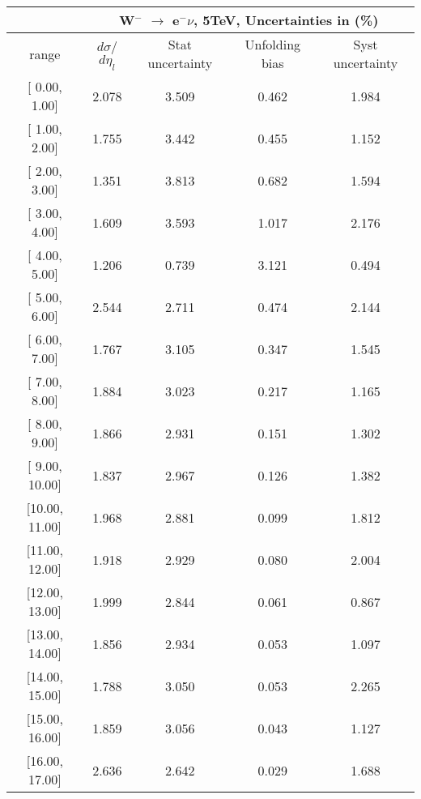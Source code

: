 \documentclass[12pt]{article}
\begin{document}
 
\begin{table}[] 
\begin{tabular}{c|c|c|c|c|}
\cline{2-5}
& \multicolumn{4}{c|}{W$^{-}$ $\rightarrow$ e$^{-} \nu $, 5TeV, Uncertainties in (\%)}  \\ \hline \hline 
\multicolumn{1}{|c|}{  range } & $d\sigma$/$d\eta_{l}$   & Stat uncertainty     & Unfolding bias     & Syst uncertainty        \\ \hline \hline 
\multicolumn{1}{|c|}{{[} 0.00,   1.00{]}}  & 2.078 & 3.509 & 0.462 & 1.984 \\ \hline 
\multicolumn{1}{|c|}{{[} 1.00,   2.00{]}}  & 1.755 & 3.442 & 0.455 & 1.152 \\ \hline 
\multicolumn{1}{|c|}{{[} 2.00,   3.00{]}}  & 1.351 & 3.813 & 0.682 & 1.594 \\ \hline 
\multicolumn{1}{|c|}{{[} 3.00,   4.00{]}}  & 1.609 & 3.593 & 1.017 & 2.176 \\ \hline 
\multicolumn{1}{|c|}{{[} 4.00,   5.00{]}}  & 1.206 & 0.739 & 3.121 & 0.494 \\ \hline 
\multicolumn{1}{|c|}{{[} 5.00,   6.00{]}}  & 2.544 & 2.711 & 0.474 & 2.144 \\ \hline 
\multicolumn{1}{|c|}{{[} 6.00,   7.00{]}}  & 1.767 & 3.105 & 0.347 & 1.545 \\ \hline 
\multicolumn{1}{|c|}{{[} 7.00,   8.00{]}}  & 1.884 & 3.023 & 0.217 & 1.165 \\ \hline 
\multicolumn{1}{|c|}{{[} 8.00,   9.00{]}}  & 1.866 & 2.931 & 0.151 & 1.302 \\ \hline 
\multicolumn{1}{|c|}{{[} 9.00,  10.00{]}}  & 1.837 & 2.967 & 0.126 & 1.382 \\ \hline 
\multicolumn{1}{|c|}{{[}10.00,  11.00{]}}  & 1.968 & 2.881 & 0.099 & 1.812 \\ \hline 
\multicolumn{1}{|c|}{{[}11.00,  12.00{]}}  & 1.918 & 2.929 & 0.080 & 2.004 \\ \hline 
\multicolumn{1}{|c|}{{[}12.00,  13.00{]}}  & 1.999 & 2.844 & 0.061 & 0.867 \\ \hline 
\multicolumn{1}{|c|}{{[}13.00,  14.00{]}}  & 1.856 & 2.934 & 0.053 & 1.097 \\ \hline 
\multicolumn{1}{|c|}{{[}14.00,  15.00{]}}  & 1.788 & 3.050 & 0.053 & 2.265 \\ \hline 
\multicolumn{1}{|c|}{{[}15.00,  16.00{]}}  & 1.859 & 3.056 & 0.043 & 1.127 \\ \hline 
\multicolumn{1}{|c|}{{[}16.00,  17.00{]}}  & 2.636 & 2.642 & 0.029 & 1.688 \\ \hline 

\end{tabular}
\end{table}
\end{document}
